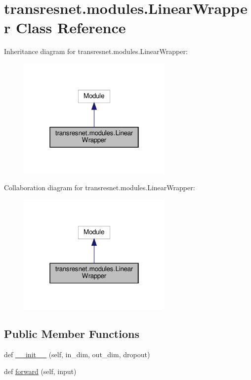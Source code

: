 \hypertarget{classtransresnet_1_1modules_1_1LinearWrapper}{}\section{transresnet.\+modules.\+Linear\+Wrapper Class Reference}
\label{classtransresnet_1_1modules_1_1LinearWrapper}


Inheritance diagram for transresnet.\+modules.\+Linear\+Wrapper\+:
\nopagebreak
\begin{figure}[H]
\begin{center}
\leavevmode
\includegraphics[width=214pt]{classtransresnet_1_1modules_1_1LinearWrapper__inherit__graph}
\end{center}
\end{figure}


Collaboration diagram for transresnet.\+modules.\+Linear\+Wrapper\+:
\nopagebreak
\begin{figure}[H]
\begin{center}
\leavevmode
\includegraphics[width=214pt]{classtransresnet_1_1modules_1_1LinearWrapper__coll__graph}
\end{center}
\end{figure}
\subsection*{Public Member Functions}
\begin{DoxyCompactItemize}
\item 
def \hyperlink{classtransresnet_1_1modules_1_1LinearWrapper_aed7acb4e51cc10c1898a6100c020b74b}{\+\_\+\+\_\+init\+\_\+\+\_\+} (self, in\+\_\+dim, out\+\_\+dim, dropout)
\item 
def \hyperlink{classtransresnet_1_1modules_1_1LinearWrapper_a0555b18d80bd70ac90fa9c236a5f62db}{forward} (self, input)
\end{DoxyCompactItemize}
